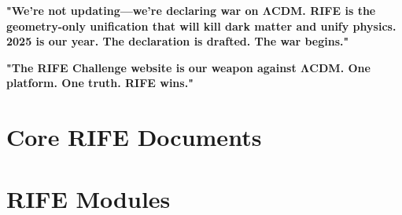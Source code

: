 \documentclass[11pt]{report}
\begin{document}
\textbf{"We're not updating—we're declaring war on ΛCDM. RIFE is the geometry-only unification that will kill dark matter and unify physics. 2025 is our year. The declaration is drafted. The war begins."}

\textbf{"The RIFE Challenge website is our weapon against ΛCDM. One platform. One truth. RIFE wins."}

\appendix

\section{Core RIFE Documents}




\section{RIFE Modules}





\end{document}
